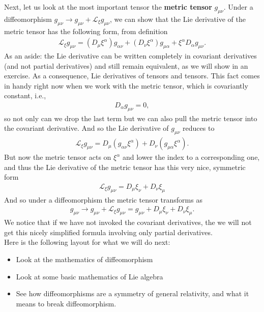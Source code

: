 \documentclass{book}
\numberwithin{equation}{section}
\theoremstyle{definition}
\newcommand{\lag}{\mathcal{L}}
\newcommand{\lp}{\left(}
\newcommand{\rp}{\right)}
\begin{document}
Next, let us look at the most important tensor the \textbf{metric tensor} $g_{\mu\nu}$. Under a diffeomorphism $g_{\mu\nu} \to g_{\mu\nu} + \lag_\xi g_{\mu\nu}$, we can show that the Lie derivative of the metric tensor has the following form, from definition 
\begin{align}
\lag_\xi g_{\mu\nu} = (D_\mu\xi^\alpha)g_{\alpha\nu} + (D_\nu \xi^\alpha)g_{\mu\alpha} + \xi^\alpha D_\alpha g_{\mu\nu}.
\end{align}
As an aside: the Lie derivative can be written completely in covariant derivatives (and not partial derivatives) and still remain equivalent, as we will show in an exercise. As a consequence, Lie derivatives of tensors and tensors. This fact comes in handy right now when we work with the metric tensor, which is covariantly constant, i.e., 
\begin{align}
D_{\alpha}g_{\mu\nu} = 0,
\end{align}
so not only can we drop the last term but we can also pull the metric tensor into the covariant derivative. And so the Lie derivative of $g_{\mu\nu}$ reduces to
\begin{align}
\lag_\xi g_{\mu\nu} = D_\mu \lp g_{\alpha\nu} \xi^\alpha \rp + D_\nu \lp g_{\mu\alpha}\xi^\alpha \rp .
\end{align}
But now the metric tensor acts on $\xi^{\alpha}$ and lower the index to a corresponding one, and thus the Lie derivative of the metric tensor has this very nice, symmetric form
\begin{align}
\boxed{ \lag_\xi g_{\mu\nu} = D_\mu \xi_\nu + D_\nu \xi_\mu }
\end{align}
And so under a diffeomorphism the metric tensor transforms as
\begin{align}
g_{\mu\nu} \to g_{\mu\nu} + \lag_\xi g_{\mu\nu} = g_{\mu\nu}+ D_\mu\xi_\nu + D_\nu \xi_\mu .
\end{align}
We notice that if we have not invoked the covariant derivatives, the we will not get this nicely simplified formula involving only partial derivatives. \\

Here is the following layout for what we will do next:
\begin{itemize}
	\item Look at the mathematics of diffeomorphism
	\item Look at some basic mathematics of Lie algebra
	\item See how diffeomorphisms are a symmetry of general relativity, and what it means to break diffeomorphism. 
\end{itemize}
\end{document}

